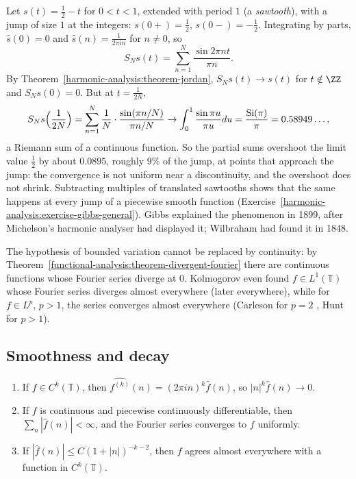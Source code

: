 \begin{example}\label{harmonic-analysis:example-gibbs}
Let $s(t) = \frac12 - t$ for $0 < t < 1$, extended with period $1$ (a \emph{sawtooth}), with a jump of size $1$ at the integers: $s(0+) = \frac12$, $s(0-) = -\frac12$. Integrating by parts, $\hat s(0) = 0$ and
$\hat s(n) = \frac{1}{2\pi in}$ for $n \neq 0$, so
\[
S_Ns(t) = \sum_{n=1}^N\frac{\sin 2\pi nt}{\pi n}.
\]
By Theorem~\ref{harmonic-analysis:theorem-jordan}, $S_Ns(t) \to s(t)$ for $t \notin \ZZ$ and $S_Ns(0) = 0$. But at $t = \frac{1}{2N}$,
\[
S_Ns\Bigl(\frac{1}{2N}\Bigr) = \sum_{n=1}^N\frac1N\cdot\frac{\sin(\pi n/N)}{\pi n/N} \to \int_0^1\frac{\sin\pi u}{\pi u}du = \frac{\operatorname{Si}(\pi)}{\pi} = 0.58949\ldots,
\]
a Riemann sum of a continuous function. So the partial sums overshoot the limit value $\frac12$ by about $0.0895$, roughly $9\%$ of the jump, at points that approach the jump: the convergence is not uniform near a
discontinuity, and the overshoot does not shrink. Subtracting multiples of translated sawtooths shows that the same happens at every jump of a piecewise smooth function
(Exercise~\ref{harmonic-analysis:exercise-gibbs-general}). Gibbs explained the phenomenon in 1899, after Michelson's harmonic analyser had displayed it; Wilbraham had found it in 1848.
\end{example}

\begin{counterexample}\label{harmonic-analysis:counterexample-continuity-not-enough}
The hypothesis of bounded variation cannot be replaced by continuity: by Theorem~\ref{functional-analysis:theorem-divergent-fourier} there are continuous functions whose Fourier series diverge at $0$. Kolmogorov even found
$f \in L^1(\mathbb{T})$ whose Fourier series diverges almost everywhere \cite{kolmogorov-1923} (later everywhere), while for $f \in L^p$, $p > 1$, the series converges almost everywhere (Carleson for $p = 2$
\cite{carleson-1966}, Hunt for $p > 1$).
\end{counterexample}

\subsection{Smoothness and decay}\label{harmonic-analysis:subsection-smoothness}

\begin{proposition}\label{harmonic-analysis:proposition-smoothness-decay}
\begin{enumerate}
\item If $f \in C^k(\mathbb{T})$, then $\widehat{f^{(k)}}(n) = (2\pi in)^k\hat f(n)$, so $|n|^k\hat f(n) \to 0$.
\item If $f$ is continuous and piecewise continuously differentiable, then $\sum_n|\hat f(n)| < \infty$, and the Fourier series converges to $f$ uniformly.
\item If $|\hat f(n)| \leq C(1 + |n|)^{-k-2}$, then $f$ agrees almost everywhere with a function in $C^k(\mathbb{T})$.
\end{enumerate}
\end{proposition}


